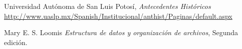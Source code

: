 \begin{thebibliography}{9}

Universidad Autónoma de San Luis Potosí, {\it Antecedentes Históricos} \\
{\url{http://www.uaslp.mx/Spanish/Institucional/anthist/Paginas/default.aspx}}

Mary E. S. Loomis {\it Estructura de datos y organización de archivos}, Segunda edición.


\end{thebibliography}
